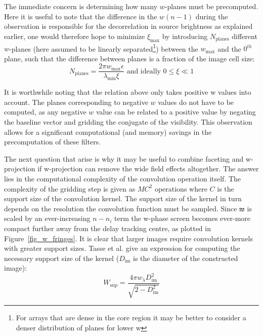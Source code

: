 The immediate concern is determining how many $w$-planes must be precomputed. Here it is useful to note that the difference in the $w(n-1)$ during the
observation is responsible for the decorrelation in source brightness as explained earlier, one would therefore hope to minimize $\xi_{\text{max}}$ by introducing
$N_{\text{planes}}$ different $w$-planes (here assumed to be linearly separated\footnote{For arrays that are dense in the core region it may be better to consider
a denser distribution of planes for lower w}) between the $w_{\text{max}}$ and the $0^{th}$ plane, such that the difference between planes is a fraction of the image cell size:
\begin{equation}
 N_{\text{planes}}=\frac{2{\pi}w_{\text{max}}\epsilon}{{\lambda_{\text{min}}}{\xi}} \text{ and ideally } 0{\leq\xi\ll}1
\end{equation}

It is worthwhile noting that the relation above only takes positive w values into account. The planes corresponding to negative $w$ values do not have to be computed,
as any negative $w$ value can be related to a positive value by negating the baseline vector and gridding the conjugate of the visibility. This observation allows
for a significant computational (and memory) savings in the precomputation of these filters.

The next question that arise is why it may be useful to combine faceting and w-projection if w-projection can remove the wide field effects altogether. The answer
lies in the computational complexity of the convolution operation itself. The complexity of the gridding step is given as $MC^2$ operations where $C$ is the support
size of the convolution kernel. The support size of the kernel in turn depends on the resolution the convolution function must be sampled. Since
$\mathfrak{w}$ is scaled by an ever-increasing $n-n_i$ term the w-phase screen becomes ever-more compact further away from the delay tracking centre, as plotted 
in Figure~\ref{fig_w_fringes}. It is clear that larger images require convolution kernels with greater support sizes. Tasse et al. \cite{tasse2013applying} give 
an expression for computing the necessary support size of the kernel ($D_{\text{im}}$ is the diameter of the constructed image):
\begin{equation}
W_{\text{sup}}=\frac{4{\pi}w_{\lambda}D^2_{\text{im}}}{\sqrt{2-D^2_{\text{im}}}}
\end{equation}

